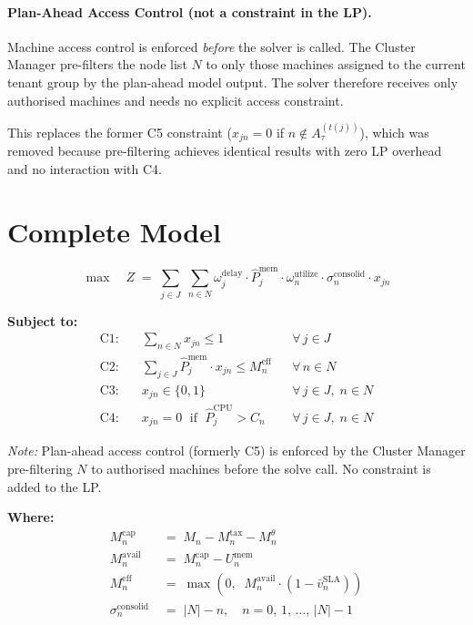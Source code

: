 \documentclass[11pt]{article}
\newcommand{\vbarsla}{\bar{v}_n^{\text{SLA}}}
\newcommand{\Meff}{M_n^{\text{eff}}}
\newcommand{\Mcap}{M_n^{\text{cap}}}
\newcommand{\Mavail}{M_n^{\text{avail}}}
\newcommand{\Mtax}{M_n^{\text{tax}}}
\newcommand{\Mtheta}{M_n^{\theta}}
\newcommand{\sigconsolid}{\sigma_n^{\text{consolid}}}
\newcommand{\omutilize}{\omega_n^{\text{utilize}}}
\newcommand{\Umem}{U_n^{\text{mem}}}
\newcommand{\omdelay}{\omega_j^{\text{delay}}}
\newcommand{\Pmem}{\hat{P}_j^{\text{mem}}}
\newcommand{\Pcpu}{\hat{P}_j^{\text{CPU}}}
\begin{document}
\paragraph{Plan-Ahead Access Control (not a constraint in the LP).}
Machine access control is enforced \emph{before} the solver is called. The
Cluster Manager pre-filters the node list $N$ to only those machines assigned
to the current tenant group by the plan-ahead model output. The solver therefore
receives only authorised machines and needs no explicit access constraint.

This replaces the former C5 constraint ($x_{jn} = 0$ if $n \notin A_{\tau}^{(t(j))}$),
which was removed because pre-filtering achieves identical results with zero LP
overhead and no interaction with C4.

\section{Complete Model}

\[
  \max \quad Z \;=\;
  \sum_{j \in J}\; \sum_{n \in N}
    \omdelay \cdot \Pmem \cdot \omutilize \cdot \sigconsolid \cdot x_{jn}
\]

\noindent\textbf{Subject to:}
\begin{align*}
  \text{C1:}&\quad \sum_{n \in N} x_{jn} \leq 1
    && \forall\, j \in J \\[4pt]
  \text{C2:}&\quad \sum_{j \in J} \Pmem \cdot x_{jn} \leq \Meff
    && \forall\, n \in N \\[4pt]
  \text{C3:}&\quad x_{jn} \in \{0,1\}
    && \forall\, j \in J,\; n \in N \\[4pt]
  \text{C4:}&\quad x_{jn} = 0 \;\text{ if }\; \Pcpu > C_n
    && \forall\, j \in J,\; n \in N
\end{align*}

\noindent\textit{Note:} Plan-ahead access control (formerly C5) is enforced by
the Cluster Manager pre-filtering $N$ to authorised machines before the solve
call. No constraint is added to the LP.

\noindent\textbf{Where:}
\begin{align*}
  \Mcap    &\;=\; M_n - \Mtax - \Mtheta \\[4pt]
  \Mavail  &\;=\; \Mcap - \Umem \\[4pt]
  \Meff    &\;=\; \max\!\left(0,\;\; \Mavail \cdot (1 - \vbarsla)\right) \\[4pt]
  \sigconsolid &\;=\; |N| - n, \quad n = 0,\,1,\,\ldots,\,|N|-1
\end{align*}
\end{document}
